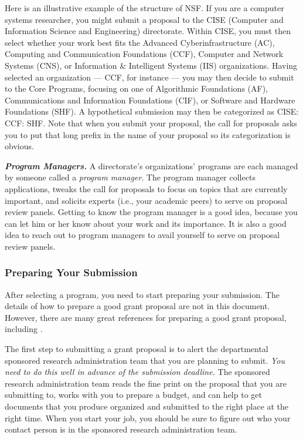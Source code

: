 Here is an illustrative example of the structure of NSF. If you are a computer
systems researcher, you might submit a proposal to the CISE (Computer and
Information Science and Engineering) directorate.  Within CISE, you must then
select whether your work best fits the Advanced Cyberinfrastructure (AC),
Computing and Communication Foundations (CCF), Computer and Network Systems
(CNS), or Information \& Intelligent Systems (IIS) organizations.  Having
selected an organization --- CCF, for instance --- you may then decide to
submit to the Core Programs, focusing on one of Algorithmic Foundations (AF),
Communications and Information Foundations (CIF), or Software and Hardware
Foundations (SHF).  A hypothetical submission may then be categorized as CISE:
CCF: SHF.  Note that when you submit your proposal, the call for proposals asks
you to put that long prefix in the name of your proposal so its categorization
is obvious.

{\noindent \em \bf Program Managers.}
A directorate's organizations' programs are each managed by someone called a
{\em program manager}.  The program manager collects applications, tweaks the
call for proposals to focus on topics that are currently important, and
solicits experts (i.e., your academic peers) to serve on proposal review
panels.  Getting to know the program manager is a good idea, because you can
let him or her know about your work and its importance.  It is also a good idea
to reach out to program managers to avail yourself to serve on proposal review
panels.  

\subsubsection{Preparing Your Submission}
After selecting a program, you need to start preparing your submission.  The
details of how to prepare a good grant proposal are not in this document.
However, there are many great references for preparing a good grant proposal,
including .

The first step to submitting a grant proposal is to alert the departmental
sponsored research administration team that you are planning to submit.  {\em
You need to do this well in advance of the submission deadline.}  The sponsored
research administration team reads the fine print on the proposal that you are
submitting to, works with you to prepare a budget, and can help to get
documents that you produce organized and submitted to the right place at the
right time.  When you start your job, you should be sure to figure out who your
contact person is in the sponsored research administration team. 

